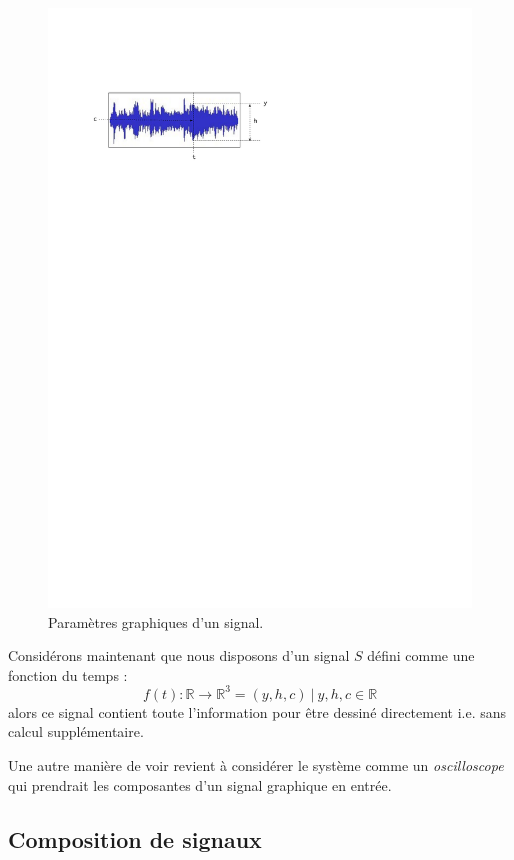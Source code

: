 \documentclass{article}
\begin{document}
\begin{figure}[htbp]
\centerline{
	\includegraphics[width=0.90\columnwidth]{imgs/graph}}
\caption{Paramètres graphiques d'un signal.}
\label{fig:siggraph}
\end{figure}

Considérons maintenant que nous disposons d'un signal $S$  défini comme une fonction du temps :
\[f(t)  : \mathbb{R} \rightarrow \mathbb{R}^3 =  (y, h, c)\ |\ y, h, c \in \mathbb{R} \]
alors ce signal contient toute l'information pour être dessiné directement i.e. sans calcul supplémentaire.

Une autre manière de voir revient à considérer le système comme un \emph{oscilloscope} qui prendrait les composantes d'un signal graphique en entrée.


\subsection{Composition de signaux}
\end{document}
